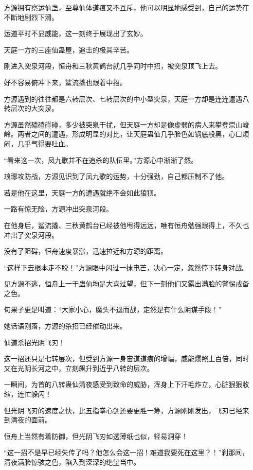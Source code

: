 \begin{this_body}
方源拥有察运仙蛊，至尊仙体道痕又不互斥，他可以明显地感受到，自己的运势在不断地剧烈下滑。

运道平时不显威能，这一刻终于展现出了玄妙。

天庭一方的三座仙蛊屋，追击的极其辛苦。

刚进入突泉河段，恒舟和三秋黄鹤台就几乎同时中招，被突泉顶飞上去。

好不容易俯冲下来，鲨流撬也跟着中招。

方源遇到的往往都是六转层次、七转层次的中小型突泉，天庭一方却是连连遭遇八转层次的大突泉。

方源虽然磕磕碰碰，多少被突泉干扰，但天庭一方却是像虚弱的病人来攀登崇山峻岭。两者之间的遭遇，形成明显的对比，让天庭蛊仙几乎脸色如锅底般黑，心口烦闷，几乎气得要吐血。

“看来这一次，凤九歌并不在追杀的队伍里。”方源心中渐渐了然。

琅琊攻防战，方源见识到了凤九歌的运势，十分强劲，自己都压制不了他。

若是他在这里，天庭一方的遭遇就绝不会如此狼狈。

一路有惊无险，方源冲出突泉河段。

在他身后，鲨流撬、三秋黄鹤台已经被他甩得远远，唯有恒舟勉强跟得上，不久也冲出了突泉河段。

没有了阻碍，恒舟速度暴涨，迅速拉近和方源的距离。

“这样下去根本走不脱！”方源眼中闪过一抹电芒，决心一定，忽然停下转身对战。

见方源不逃，恒舟上一干蛊仙均是大喜过望，但下一刻他们又露出满脸的警惕戒备之色。

旬果子更是叫道：“大家小心，魔头不退而战，定然是有什么阴谋手段！”

她话语刚落，方源的杀招已经催动出来。

仙道杀招光阴飞刃！

这一招还只是七转层次，但受到方源一身宙道道痕的增幅，威能爆照上百倍，同时又在光阴长河之中，立刻飙升到近乎八转的层次。

一瞬间，为首的八转蛊仙清夜感受到致命的威胁，浑身上下汗毛炸立，心脏狠狠收缩，连忙躲闪！

但光阴飞刃的速度之快，比五指拳心剑还要更胜一筹，方源刚刚发出，飞刃已经来到清夜的面前。

恒舟上当然有着防御，但光阴飞刃如透薄纸也似，轻易洞穿！

“这一招不是早已经失传了吗？他怎么会这一招！难道我要死在这里？！”刹那间，清夜满脸惊骇之色，陷入到深深的绝望当中。


\end{this_body}
